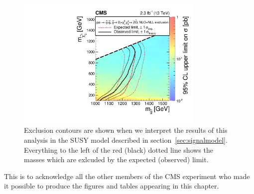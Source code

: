 \begin{figure}[!htb]
\begin{center}
\includegraphics[width=0.8\textwidth]{results/figs/T5ZZ_Exclusion_13TeV.pdf}
\caption{
  Exclusion contours are shown when we interpret the results of this analysis in the SUSY model described in section~\ref{sec:signalmodel}.
  Everything to the left of the red (black) dotted line shows the masses which are exlcuded by the expected (observed) limit.
\label{fig:results_T5ZZ}}
\end{center}
\end{figure}


This is to acknowledge all the other members of the CMS experiment who made it possible to produce
the figures and tables appearing in this chapter.

\clearpage
